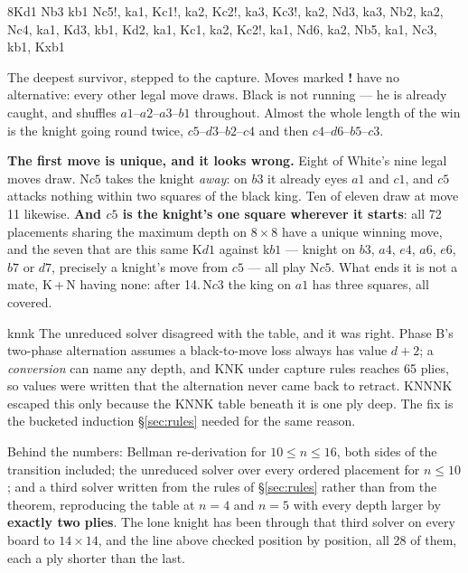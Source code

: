 \documentclass[10pt]{article}
\begin{document}
\medskip
\noindent
\begin{minipage}[t]{0.40\textwidth}
\begin{stepboard}[width=\linewidth,board=3.44cm,height=49mm,variant=C,
  intro={K$d1$ N$b3$ vs k$b1$ --- \textbf{mate in 14, 27 plies}}]{8}{Kd1 Nb3 kb1}
  Nc5!, ka1, Kc1!, ka2, Kc2!, ka3, Kc3!, ka2,
  Nd3,  ka3, Nb2,  ka2, Nc4,  ka1, Kd3,  kb1,
  Kd2,  ka1, Kc1,  ka2, Kc2!, ka1, Nd6,  ka2,
  Nb5,  ka1, Nc3,  kb1, Kxb1
\end{stepboard}
\end{minipage}\hfill
\begin{minipage}[t]{0.56\textwidth}\vspace{0pt}\small
The deepest survivor, stepped to the capture. Moves marked \textbf{!} have no
alternative: every other legal move draws. Black is not running --- he is
already caught, and shuffles $a1$--$a2$--$a3$--$b1$ throughout. Almost the
whole length of the win is the knight going round twice,
$c5$--$d3$--$b2$--$c4$ and then $c4$--$d6$--$b5$--$c3$.

\smallskip
\textbf{The first move is unique, and it looks wrong.} Eight of White's nine
legal moves draw. N$c5$ takes the knight \emph{away}: on $b3$ it already eyes
$a1$ and $c1$, and $c5$ attacks nothing within two squares of the black king.
Ten of eleven draw at move 11 likewise. \textbf{And $c5$ is the knight's one
square wherever it starts}: all 72 placements sharing the maximum depth on
$8\times8$ have a unique winning move, and the seven that are this same K$d1$
against k$b1$ --- knight on $b3$, $a4$, $e4$, $a6$, $e6$, $b7$ or $d7$,
precisely a knight's move from $c5$ --- all play N$c5$. What ends it is not a
mate, K\,+\,N having none: after 14.\,N$c3$ the king on $a1$ has three squares,
all covered.
\end{minipage}

\begin{result}[title={How this one was checked, and what it caught}]{knnk}
The unreduced solver disagreed with the table, and it was right. Phase B's
two-phase alternation assumes a black-to-move loss always has value $d+2$; a
\emph{conversion} can name any depth, and KNK under capture rules reaches 65
plies, so values were written that the alternation never came back to retract.
KNNNK escaped this only because the KNNK table beneath it is one ply deep. The
fix is the bucketed induction \S\ref{sec:rules} needed for the same reason.

\smallskip
Behind the numbers: Bellman re-derivation for $10\le n\le16$, both sides of the
transition included; the unreduced solver over every ordered placement for
$n\le10$; and a third solver written from the rules of \S\ref{sec:rules} rather
than from the theorem, reproducing the table at $n=4$ and $n=5$ with every
depth larger by \textbf{exactly two plies}. The lone knight has been through
that third solver on every board to $14\times14$, and the line above checked
position by position, all 28 of them, each a ply shorter than the last.
\end{result}
\end{document}

